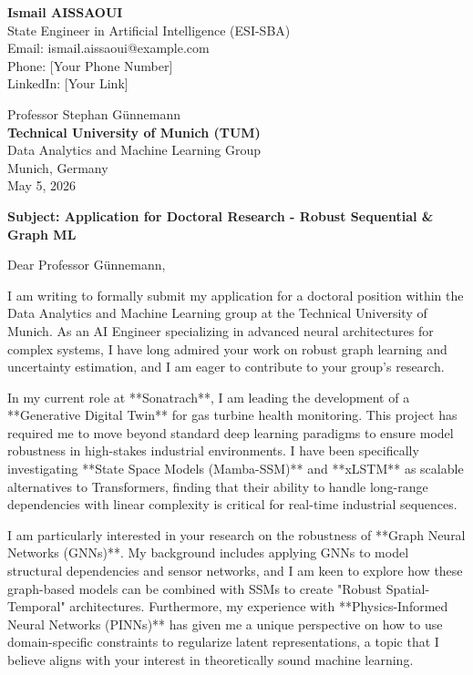 \documentclass[11pt,a4paper]{article}
\begin{document}
\noindent \textbf{Ismail AISSAOUI} \\
State Engineer in Artificial Intelligence (ESI-SBA) \\
Email: ismail.aissaoui@example.com \\
Phone: [Your Phone Number] \\
LinkedIn: [Your Link]

\bigskip

\begin{flushright}
    Professor Stephan Günnemann \\
    \textbf{Technical University of Munich (TUM)} \\
    Data Analytics and Machine Learning Group \\
    Munich, Germany \\
    \medskip
    May 5, 2026
\end{flushright}

\bigskip

\noindent \textbf{Subject: Application for Doctoral Research - Robust Sequential & Graph ML}

\bigskip

Dear Professor Günnemann,

I am writing to formally submit my application for a doctoral position within the Data Analytics and Machine Learning group at the Technical University of Munich. As an AI Engineer specializing in advanced neural architectures for complex systems, I have long admired your work on robust graph learning and uncertainty estimation, and I am eager to contribute to your group's research.

In my current role at **Sonatrach**, I am leading the development of a **Generative Digital Twin** for gas turbine health monitoring. This project has required me to move beyond standard deep learning paradigms to ensure model robustness in high-stakes industrial environments. I have been specifically investigating **State Space Models (Mamba-SSM)** and **xLSTM** as scalable alternatives to Transformers, finding that their ability to handle long-range dependencies with linear complexity is critical for real-time industrial sequences.

I am particularly interested in your research on the robustness of **Graph Neural Networks (GNNs)**. My background includes applying GNNs to model structural dependencies and sensor networks, and I am keen to explore how these graph-based models can be combined with SSMs to create "Robust Spatial-Temporal" architectures. Furthermore, my experience with **Physics-Informed Neural Networks (PINNs)** has given me a unique perspective on how to use domain-specific constraints to regularize latent representations, a topic that I believe aligns with your interest in theoretically sound machine learning.
\end{document}
